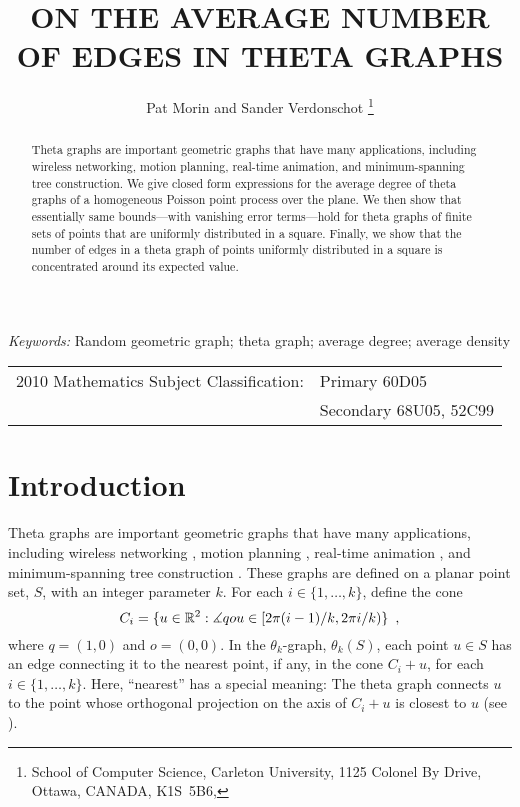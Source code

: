 \documentclass{patmorin}
\title{\MakeUppercase{On the Average Number of Edges in Theta Graphs}}
\author{Pat Morin and Sander Verdonschot%
	\thanks{School of Computer Science, Carleton University, 1125 Colonel By Drive, Ottawa, CANADA, K1S~5B6, \email{\{morin,sander\}@cg.scs.carleton.ca}}}
\begin{document}
\begin{titlepage}
\maketitle

\begin{abstract}
  Theta graphs are important geometric graphs that have many applications,
  including wireless networking, motion planning, real-time animation, and
  minimum-spanning tree construction.  We give closed form expressions
  for the average degree of theta graphs of a homogeneous Poisson
  point process over the plane.  We then show that essentially same
  bounds---with vanishing error terms---hold for theta graphs of finite
  sets of points that are uniformly distributed in a square.  Finally,
  we show that the number of edges in a theta graph of points uniformly
  distributed in a square is concentrated around its expected value.
\end{abstract}

\noindent
\textit{Keywords:} Random geometric graph; theta graph; average degree;
  average density

\noindent
\begin{tabular}{@{}l@{ }l}
2010 Mathematics Subject Classification: & Primary 60D05 \\
 & Secondary 68U05, 52C99
\end{tabular}


\end{titlepage}

\section{Introduction}

Theta graphs
\cite{clarkson:approximation,keil:approximating,keil.gutwin:classes}
are important geometric graphs that have many applications,
including wireless networking \cite{alzoubi.li.ea:geometric},
motion planning \cite{clarkson:approximation}, real-time animation
\cite{fischer.lukovszki.ea:geometric}, and minimum-spanning tree
construction \cite{yao:on}.  These graphs are defined on a planar point
set, $S$, with an integer parameter $k$.  For each $i\in\{1,\ldots,
k\}$, define the cone
\[ 
   C_i=\{u\in \mathbb{R}^2: \measuredangle qou\in [2\pi(i-1)/k,2\pi i/k)\} \enspace ,
\]
where $q=(1,0)$ and $o=(0,0)$.  In the $\theta_k$-graph, $\theta_k(S)$,
each point $u\in S$ has an edge connecting it to the nearest point,
if any, in the cone $C_i+u$, for each $i\in\{1,\ldots,k\}$.  Here,
``nearest'' has a special meaning: The theta graph connects $u$ to the
point whose orthogonal projection on the axis of $C_i+u$ is closest to $u$
(see ).
\end{document}
